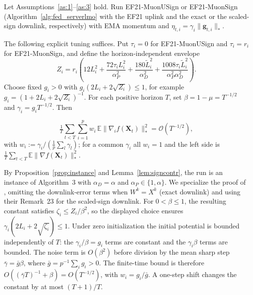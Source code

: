 \begin{corollary}\label{cor:smooth}
Let Assumptions~\ref{as:1}--\ref{as:3} hold. Run EF21-MuonUSign or EF21-MuonSign (Algorithm~\ref{alg:fed_serverlmo} with the EF21 uplink and the exact or the scaled-sign downlink, respectively) with EMA momentum and $\eta_{t,i} = \gamma_i\|\mathbf{g}_{t,i}\|_{*}$.
\begin{codex}
The following explicit tuning suffices. Put $\tau_i=0$ for EF21-MuonUSign and $\tau_i=r_i$ for EF21-MuonSign, and define the horizon-independent envelope
\[
Z_i=r_i\left(12L_i^2+\frac{72\tau_i L_i^2}{\alpha_P^2}
 +\frac{180\tilde L_i^2}{\alpha_D^2}
 +\frac{1008\tau_i\tilde L_i^2}{\alpha_P^2\alpha_D^2}\right).
\]
Choose fixed $g_i>0$ with $g_i(2L_i+2\sqrt{Z_i})\le1$, for example $g_i=(1+2L_i+2\sqrt{Z_i})^{-1}$. For each positive horizon $T$, set $\beta=1-\mu=T^{-1/2}$ and $\gamma_i=g_iT^{-1/2}$. Then
\end{codex}
\begin{equation*}
\tfrac{1}{T}\textstyle\sum_{t<T}\sum_{i=1}^p w_i\,\mathbb{E}\|\nabla_i f(\mathbf{X}_t)\|_*^2 = \mathcal{O}(T^{-1/2}),
\end{equation*}
with $w_i := \gamma_i/(\tfrac{1}{p}\sum_l\gamma_l)$; for a common $\gamma_i$ all $w_i = 1$ and the left side is $\tfrac{1}{T}\sum_{t<T}\mathbb{E}\|\nabla f(\mathbf{X}_t)\|_*^2$.
\end{corollary}
\begin{codex}
\begin{paperproof}
By Proposition~\ref{prop:instance} and Lemma~\ref{lem:signcontr}, the run is an instance of Algorithm~3 with $\alpha_D = \alpha$ and $\alpha_P \in \{1,\alpha\}$. We specialize the proof of \citet[Thm.~19]{gruntkowska2025error}, omitting the downlink-error terms when $W^k=X^k$ (exact downlink) and using their Remark~23 for the scaled-sign downlink. For $0<\beta\le1$, the resulting constant satisfies $\zeta_i\le Z_i/\beta^2$, so the displayed choice ensures $\gamma_i(2L_i+2\sqrt{\zeta_i})\le1$. Under zero initialization the initial potential is bounded independently of $T$: the $\gamma_i/\beta=g_i$ terms are constant and the $\gamma_i\beta$ terms are bounded. The noise term is $O(\beta^2)$ before division by the mean sharp step $\bar\gamma=\bar g\beta$, where $\bar g=p^{-1}\sum_i g_i>0$. The finite-time bound is therefore $O((\bar\gamma T)^{-1}+\beta)=O(T^{-1/2})$, with $w_i=g_i/\bar g$. A one-step shift changes the constant by at most $(T+1)/T$.
\end{paperproof}
\end{codex}

